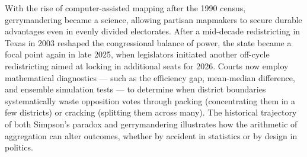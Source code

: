 \begin{historical}
With the rise of computer-assisted mapping after the 1990 census, gerrymandering became a science, allowing partisan mapmakers to secure durable advantages even in evenly divided electorates. After a mid-decade redistricting in Texas in 2003 reshaped the congressional balance of power, the state became a focal point again in late 2025, when legislators initiated another off-cycle redistricting aimed at locking in additional seats for 2026. Courts now employ mathematical diagnostics — such as the efficiency gap, mean-median difference, and ensemble simulation tests — to determine when district boundaries systematically waste opposition votes through packing (concentrating them in a few districts) or cracking (splitting them across many). The historical trajectory of both Simpson’s paradox and gerrymandering illustrates how the arithmetic of aggregation can alter outcomes, whether by accident in statistics or by design in politics.
\end{historical}
